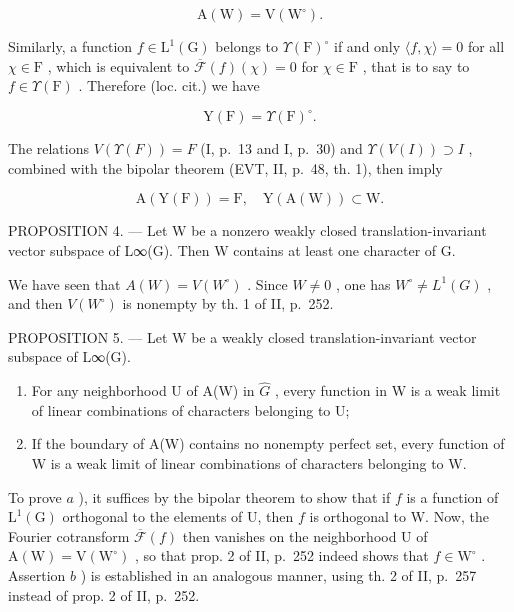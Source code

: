 \[
\mathrm{A} (\mathrm{W}) = \mathrm{V} (\mathrm{W} ^ {\circ}).
\]

Similarly, a function \(f \in \mathrm{L}^1(\mathrm{G})\) belongs to \(\Upsilon(\mathrm{F})^\circ\) if and only \(\langle f, \chi \rangle = 0\) for all \(\chi \in \mathrm{F}\) , which is equivalent to \(\overline{\mathcal{F}}(f)(\chi) = 0\) for \(\chi \in \mathrm{F}\) , that is to say to \(f \in \Upsilon(\mathrm{F})\) . Therefore (loc. cit.) we have

\[
\mathrm{Y} (\mathrm{F}) = \Upsilon (\mathrm{F}) ^ {\circ}.
\]

The relations \(V(\Upsilon(F)) = F\) (I, p.~13 and I, p.~30) and \(\Upsilon(V(I)) \supset I\) , combined with the bipolar theorem (EVT, II, p.~48, th. 1), then imply

\[
\mathrm{A} (\mathrm{Y} (\mathrm{F})) = \mathrm{F}, \quad \mathrm{Y} (\mathrm{A} (\mathrm{W})) \subset \mathrm{W}.
\]

PROPOSITION 4. --- Let W be a nonzero weakly closed translation-invariant vector subspace of L∞(G). Then W contains at least one character of G.

We have seen that \(A(W) = V(W^{\circ})\) . Since \(W \neq 0\) , one has \(W^{\circ} \neq L^{1}(G)\) , and then \(V(W^{\circ})\) is nonempty by th. 1 of II, p.~252.

PROPOSITION 5. --- Let W be a weakly closed translation-invariant vector subspace of L∞(G).

\begin{enumerate}
\def\labelenumi{\alph{enumi})}
\item
  For any neighborhood U of A(W) in \(\widehat{G}\) , every function in W is a weak limit of linear combinations of characters belonging to U;
\item
  If the boundary of A(W) contains no nonempty perfect set, every function of W is a weak limit of linear combinations of characters belonging to W.
\end{enumerate}

To prove \(a\) ), it suffices by the bipolar theorem to show that if \(f\) is a function of \(\mathrm{L}^{1}(\mathrm{G})\) orthogonal to the elements of U, then \(f\) is orthogonal to W. Now, the Fourier cotransform \(\overline{\mathcal{F}}(f)\) then vanishes on the neighborhood U of \(\mathrm{A}(\mathrm{W}) = \mathrm{V}(\mathrm{W}^{\circ})\) , so that prop. 2 of II, p.~252 indeed shows that \(f \in \mathrm{W}^{\circ}\) . Assertion \(b\) ) is established in an analogous manner, using th. 2 of II, p.~257 instead of prop. 2 of II, p.~252.

